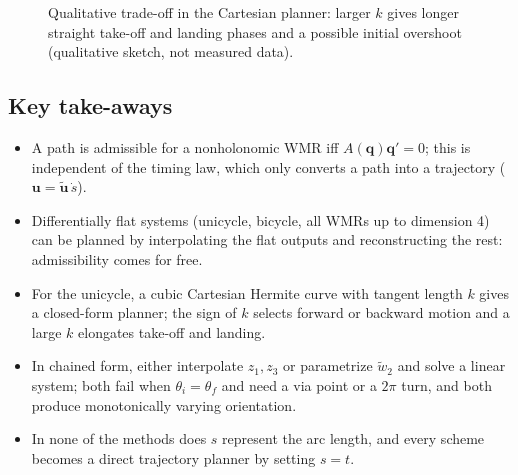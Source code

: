 \documentclass[11pt,a4paper]{article}
\newcommand{\q}{\boldsymbol{q}}
\newcommand{\ut}{\tilde{\boldsymbol{u}}}
\newcommand{\wwt}{\tilde w}
\theoremstyle{definition}
\theoremstyle{plain}
\theoremstyle{remark}
\begin{document}
\begin{figure}[h]
\centering
{}
\caption{Qualitative trade-off in the Cartesian planner: larger $k$ gives longer straight take-off and landing phases and
a possible initial overshoot (qualitative sketch, not measured data).}
\end{figure}

\subsection*{Key take-aways}
\begin{itemize}
\item A path is admissible for a nonholonomic WMR iff $A(\q)\q'=0$; this is independent of the timing law, which only
converts a path into a trajectory ($\boldsymbol u=\ut\,\dot s$).
\item Differentially flat systems (unicycle, bicycle, all WMRs up to dimension 4) can be planned by interpolating the flat outputs
and reconstructing the rest: admissibility comes for free.
\item For the unicycle, a cubic Cartesian Hermite curve with tangent length $k$ gives a closed-form planner; the sign of $k$ selects
forward or backward motion and a large $k$ elongates take-off and landing.
\item In chained form, either interpolate $z_1,z_3$ or parametrize $\wwt_2$ and solve a linear system; both fail when
$\theta_i=\theta_f$ and need a via point or a $2\pi$ turn, and both produce monotonically varying orientation.
\item In none of the methods does $s$ represent the arc length, and every scheme becomes a direct trajectory planner by
setting $s=t$.
\end{itemize}
\end{document}
